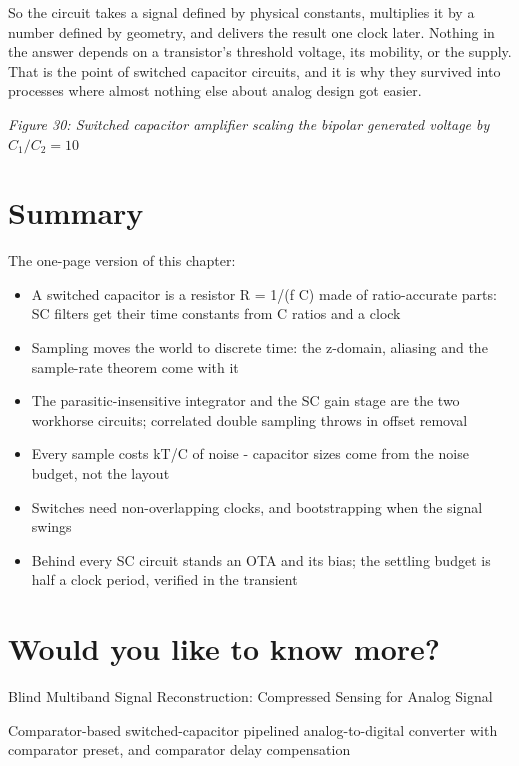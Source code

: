So the circuit takes a signal defined by physical constants, multiplies
it by a number defined by geometry, and delivers the result one clock
later. Nothing in the answer depends on a transistor's threshold
voltage, its mobility, or the supply. That is the point of switched
capacitor circuits, and it is why they survived into processes where
almost nothing else about analog design got easier.


{
\centering
{}
}

\emph{Figure 30: Switched capacitor amplifier scaling the bipolar
generated voltage by \(C_1/C_2 = 10\)}

\section{Summary}\label{summary}

The one-page version of this chapter:

\begin{itemize}
\tightlist
\item
  A switched capacitor is a resistor R = 1/(f C) made of ratio-accurate
  parts: SC filters get their time constants from C ratios and a clock
\item
  Sampling moves the world to discrete time: the z-domain, aliasing and
  the sample-rate theorem come with it
\item
  The parasitic-insensitive integrator and the SC gain stage are the two
  workhorse circuits; correlated double sampling throws in offset
  removal
\item
  Every sample costs kT/C of noise - capacitor sizes come from the noise
  budget, not the layout
\item
  Switches need non-overlapping clocks, and bootstrapping when the
  signal swings
\item
  Behind every SC circuit stands an OTA and its bias; the settling
  budget is half a clock period, verified in the transient
\end{itemize}

\section{Would you like to know
more?}\label{would-you-like-to-know-more}

Blind Multiband Signal Reconstruction: Compressed Sensing for Analog
Signal 

Comparator-based switched-capacitor pipelined analog-to-digital
converter with comparator preset, and comparator delay compensation

